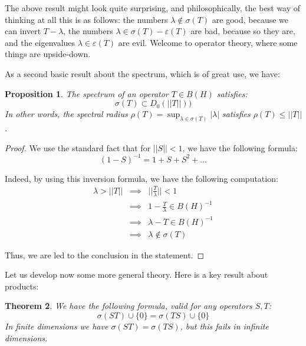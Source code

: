 \documentclass[12pt]{amsbook}
\newtheorem{theorem}{Theorem}[chapter]
\newtheorem{proposition}[theorem]{Proposition}
\begin{document}
The above result might look quite surprising, and philosophically, the best way of thinking at all this is as follows: the numbers $\lambda\notin\sigma(T)$ are good, because we can invert $T-\lambda$, the numbers $\lambda\in\sigma(T)-\varepsilon(T)$ are bad, because so they are, and the eigenvalues $\lambda\in\varepsilon(T)$ are evil. Welcome to operator theory, where some things are upside-down.

\bigskip

As a second basic result about the spectrum, which is of great use, we have:

\begin{proposition}
The spectrum of an operator $T\in B(H)$ satisfies:
$$\sigma(T)\subset D_0(||T||))$$
In other words, the spectral radius $\rho(T)=\sup_{\lambda\in\sigma(T)}|\lambda|$ satisfies $\rho(T)\leq||T||$. 
\end{proposition}

\begin{proof}
We use the standard fact that for $||S||<1$, we have the following formula:
$$(1-S)^{-1}=1+S+S^2+\ldots$$

Indeed, by using this inversion formula, we have the following computation:
\begin{eqnarray*}
\lambda>||T||
&\implies&\Big|\Big|\frac{T}{\lambda}\Big|\Big|<1\\
&\implies&1-\frac{T}{\lambda}\in B(H)^{-1}\\
&\implies&\lambda-T\in B(H)^{-1}\\
&\implies&\lambda\notin\sigma(T)
\end{eqnarray*}

Thus, we are led to the conclusion in the statement.
\end{proof}

Let us develop now some more general theory. Here is a key result about products:


\begin{theorem}
We have the following formula, valid for any operators $S,T$:
$$\sigma(ST)\cup\{0\}=\sigma(TS)\cup\{0\}$$
In finite dimensions we have $\sigma(ST)=\sigma(TS)$, but this fails in infinite dimensions.
\end{theorem}
\end{document}
